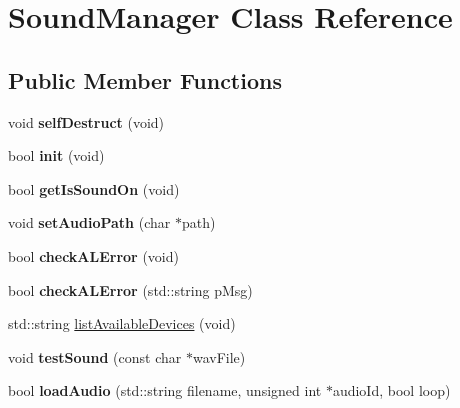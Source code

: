 \hypertarget{class_sound_manager}{\section{Sound\-Manager Class Reference}
\label{class_sound_manager}
}
\subsection*{Public Member Functions}
\begin{DoxyCompactItemize}
\item 
\hypertarget{class_sound_manager_af2c2429cfe27a2a12cc2edbd9dc21d5f}{void {\bfseries self\-Destruct} (void)}\label{class_sound_manager_af2c2429cfe27a2a12cc2edbd9dc21d5f}

\item 
\hypertarget{class_sound_manager_ae47c851f33f89439e14bd2af4ff509b5}{bool {\bfseries init} (void)}\label{class_sound_manager_ae47c851f33f89439e14bd2af4ff509b5}

\item 
\hypertarget{class_sound_manager_a8e4feb6d4ecc6f14b6c7a2980e3ffbd4}{bool {\bfseries get\-Is\-Sound\-On} (void)}\label{class_sound_manager_a8e4feb6d4ecc6f14b6c7a2980e3ffbd4}

\item 
\hypertarget{class_sound_manager_aae8a2bf6adbc0a0db77bce8cfcea84a1}{void {\bfseries set\-Audio\-Path} (char $\ast$path)}\label{class_sound_manager_aae8a2bf6adbc0a0db77bce8cfcea84a1}

\item 
\hypertarget{class_sound_manager_a9168db2a3f35a33309528ea2d822a7f9}{bool {\bfseries check\-A\-L\-Error} (void)}\label{class_sound_manager_a9168db2a3f35a33309528ea2d822a7f9}

\item 
\hypertarget{class_sound_manager_a064ebf9f1c4d8c70cf8a4e01ebe17bbf}{bool {\bfseries check\-A\-L\-Error} (std\-::string p\-Msg)}\label{class_sound_manager_a064ebf9f1c4d8c70cf8a4e01ebe17bbf}

\item 
std\-::string \hyperlink{class_sound_manager_a1d4149f97293a06e51e701da4822c47e}{list\-Available\-Devices} (void)
\item 
\hypertarget{class_sound_manager_a6c83bcf9a3441a6ee2230b721e28e238}{void {\bfseries test\-Sound} (const char $\ast$wav\-File)}\label{class_sound_manager_a6c83bcf9a3441a6ee2230b721e28e238}

\item 
\hypertarget{class_sound_manager_ac3ac90d23ae5d52f74c6d625830cad5a}{bool {\bfseries load\-Audio} (std\-::string filename, unsigned int $\ast$audio\-Id, bool loop)}\label{class_sound_manager_ac3ac90d23ae5d52f74c6d625830cad5a}


\end{DoxyCompactItemize}

